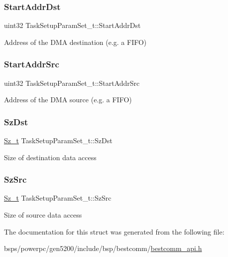 \subsubsection{\texorpdfstring{StartAddrDst}{StartAddrDst}}
{\footnotesize\ttfamily uint32 Task\+Setup\+Param\+Set\+\_\+t\+::\+Start\+Addr\+Dst}

Address of the D\+MA destination (e.\+g. a F\+I\+FO) \mbox{\label{structTaskSetupParamSet__t_a3f2118771611378fb042cbb3cc9ea9e5}} 
\subsubsection{\texorpdfstring{StartAddrSrc}{StartAddrSrc}}
{\footnotesize\ttfamily uint32 Task\+Setup\+Param\+Set\+\_\+t\+::\+Start\+Addr\+Src}

Address of the D\+MA source (e.\+g. a F\+I\+FO) \mbox{\label{structTaskSetupParamSet__t_a00cc4e75db03c6034bca670e68a5776e}} 
\subsubsection{\texorpdfstring{SzDst}{SzDst}}
{\footnotesize\ttfamily \mbox{\hyperlink{bestcomm__api_8h_a83efcf1363a5d57a19933e5149ecc816}{Sz\+\_\+t}} Task\+Setup\+Param\+Set\+\_\+t\+::\+Sz\+Dst}

Size of destination data access \mbox{\label{structTaskSetupParamSet__t_a64ede19e8b077f261a06159420147b46}} 
\subsubsection{\texorpdfstring{SzSrc}{SzSrc}}
{\footnotesize\ttfamily \mbox{\hyperlink{bestcomm__api_8h_a83efcf1363a5d57a19933e5149ecc816}{Sz\+\_\+t}} Task\+Setup\+Param\+Set\+\_\+t\+::\+Sz\+Src}

Size of source data access 

The documentation for this struct was generated from the following file\+:\begin{DoxyCompactItemize}
\item 
bsps/powerpc/gen5200/include/bsp/bestcomm/\mbox{\hyperlink{bestcomm__api_8h}{bestcomm\+\_\+api.\+h}}\end{DoxyCompactItemize}
